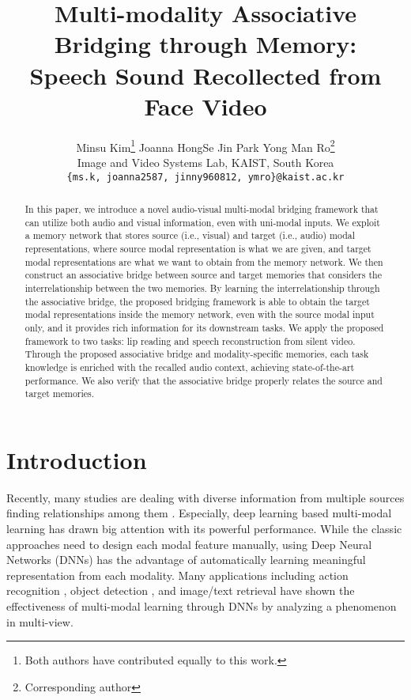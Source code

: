 \documentclass[10pt,twocolumn,letterpaper]{article}
\begin{document}
\title{Multi-modality Associative Bridging through Memory:\\ Speech Sound Recollected from Face Video}

\author{Minsu Kim\thanks{Both authors have contributed equally to this work.} \quad\quad Joanna Hong\footnotemark[1] \quad\quad Se Jin Park \quad\quad Yong Man Ro\thanks{Corresponding author} \\
Image and Video Systems Lab, KAIST, South Korea\\
{\tt\small \{ms.k, joanna2587, jinny960812, ymro\}@kaist.ac.kr}\\
}
\maketitle

\ificcvfinal\thispagestyle{empty}\fi

\begin{abstract}
In this paper, we introduce a novel audio-visual multi-modal bridging framework that can utilize both audio and visual information, even with uni-modal inputs. We exploit a memory network that stores source (i.e., visual) and target (i.e., audio) modal representations, where source modal representation is what we are given, and target modal representations are what we want to obtain from the memory network. We then construct an associative bridge between source and target memories that considers the interrelationship between the two memories. By learning the interrelationship through the associative bridge, the proposed bridging framework is able to obtain the target modal representations inside the memory network, even with the source modal input only, and it provides rich information for its downstream tasks. We apply the proposed framework to two tasks: lip reading and speech reconstruction from silent video. Through the proposed associative bridge and modality-specific memories, each task knowledge is enriched with the recalled audio context, achieving state-of-the-art performance. We also verify that the associative bridge properly relates the source and target memories.
\end{abstract}
\vspace{-0.4cm}
\section{Introduction}
Recently, many studies are dealing with diverse information from multiple sources finding relationships among them \cite{ramachandram2017multimodalsurvey}. Especially, deep learning based multi-modal learning has drawn big attention with its powerful performance. While the classic approaches \cite{huang2012trad1, cao2015trad2, wang2009trad3, wang2012trad4} need to design each modal feature manually, using Deep Neural Networks (DNNs) has the advantage of automatically learning meaningful representation from each modality.
Many applications including action recognition \cite{gao2019findfusion, kim2021multispectraldetection}, object detection \cite{eitel2015multimodalod}, and image/text retrieval \cite{zhen2019dscmr} have shown the effectiveness of multi-modal learning through DNNs by analyzing a phenomenon in multi-view.
\end{document}
